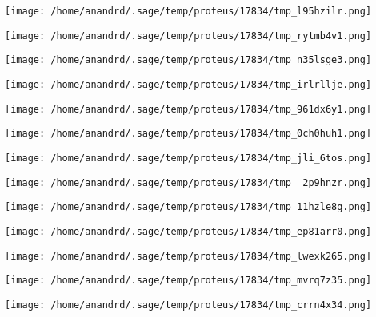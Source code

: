 \documentclass[11pt]{article}
\begin{document}
\begin{center}
\texttt{[image: /home/anandrd/.sage/temp/proteus/17834/tmp\_l95hzilr.png]}
\end{center}
\begin{center}
\texttt{[image: /home/anandrd/.sage/temp/proteus/17834/tmp\_rytmb4v1.png]}
\end{center}
\begin{center}
\texttt{[image: /home/anandrd/.sage/temp/proteus/17834/tmp\_n35lsge3.png]}
\end{center}
\begin{center}
\texttt{[image: /home/anandrd/.sage/temp/proteus/17834/tmp\_irlrllje.png]}
\end{center}
\begin{center}
\texttt{[image: /home/anandrd/.sage/temp/proteus/17834/tmp\_961dx6y1.png]}
\end{center}
\begin{center}
\texttt{[image: /home/anandrd/.sage/temp/proteus/17834/tmp\_0ch0huh1.png]}
\end{center}
\begin{center}
\texttt{[image: /home/anandrd/.sage/temp/proteus/17834/tmp\_jli\_6tos.png]}
\end{center}
\begin{center}
\texttt{[image: /home/anandrd/.sage/temp/proteus/17834/tmp\_\_2p9hnzr.png]}
\end{center}
\begin{center}
\texttt{[image: /home/anandrd/.sage/temp/proteus/17834/tmp\_11hzle8g.png]}
\end{center}
\begin{center}
\texttt{[image: /home/anandrd/.sage/temp/proteus/17834/tmp\_ep81arr0.png]}
\end{center}
\begin{center}
\texttt{[image: /home/anandrd/.sage/temp/proteus/17834/tmp\_lwexk265.png]}
\end{center}
\begin{center}
\texttt{[image: /home/anandrd/.sage/temp/proteus/17834/tmp\_mvrq7z35.png]}
\end{center}
\begin{center}
\texttt{[image: /home/anandrd/.sage/temp/proteus/17834/tmp\_crrn4x34.png]}
\end{center}
\end{document}
